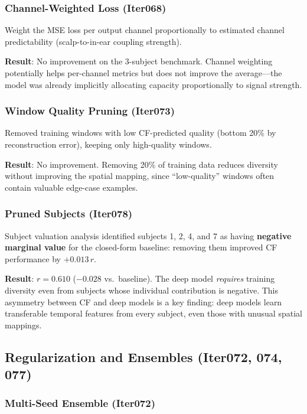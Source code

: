 \documentclass[11pt,a4paper]{article}
\begin{document}
\subsubsection{Channel-Weighted Loss (Iter068)}

Weight the MSE loss per output channel proportionally to estimated
channel predictability (scalp-to-in-ear coupling strength).

\textbf{Result}: No improvement on the 3-subject benchmark. Channel
weighting potentially helps per-channel metrics but does not improve the
average---the model was already implicitly allocating capacity
proportionally to signal strength.

\subsubsection{Window Quality Pruning (Iter073)}

Removed training windows with low CF-predicted quality (bottom 20\% by
reconstruction error), keeping only high-quality windows.

\textbf{Result}: No improvement. Removing 20\% of training data reduces
diversity without improving the spatial mapping, since ``low-quality''
windows often contain valuable edge-case examples.

\subsubsection{Pruned Subjects (Iter078)}

Subject valuation analysis identified subjects 1, 2, 4, and 7 as having
\textbf{negative marginal value} for the closed-form baseline: removing
them improved CF performance by $+0.013\,r$.

\textbf{Result}: $r = 0.610$ (\textcolor{bad}{$-0.028$} vs.\ baseline).
The deep model \emph{requires} training diversity even from subjects whose
individual contribution is negative. This asymmetry between CF and deep
models is a key finding: deep models learn transferable temporal features
from every subject, even those with unusual spatial mappings.

\subsection{Regularization and Ensembles (Iter072, 074, 077)}

\subsubsection{Multi-Seed Ensemble (Iter072)}
\end{document}
